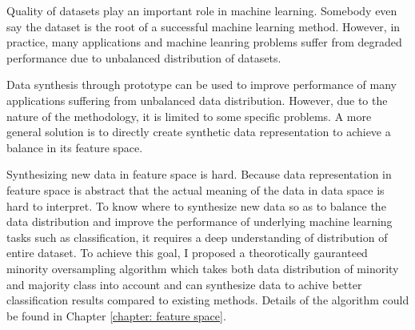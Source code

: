 \documentclass{iitthesis}
\begin{document}


 Quality of datasets play an important role in machine learning. Somebody even say the dataset is the root of a successful machine learning method. However, in practice, many applications and machine leanring problems suffer from degraded performance due to unbalanced distribution of datasets.

Data synthesis through prototype can be used to improve performance of many applications suffering from unbalanced data distribution. However, due to the nature of the methodology, it is limited to some specific problems.  A more general solution is to directly create synthetic data representation to achieve a balance in its feature space. 


Synthesizing new data in feature space is hard. Because data representation in feature space is abstract that the actual meaning of the data in data space is hard to interpret. To know where to synthesize new data so as to balance the data distribution and improve the performance of underlying machine learning tasks such as classification, it requires a deep understanding of distribution of entire dataset. To achieve this goal, I proposed a theorotically gauranteed minority oversampling algorithm which takes both data distribution of minority and majority class into account and can synthesize data to achive better classification results compared to existing methods. Details of the algorithm could be found in Chapter \ref{chapter: feature space}.

\clearpage
\end{document}
